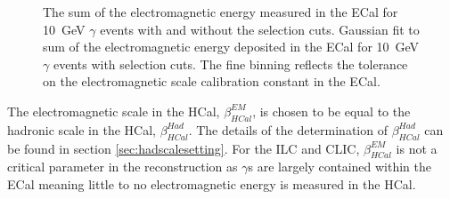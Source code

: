 \begin{figure}[h!]
\caption[\protect{} The sum of the electromagnetic energy measured in the ECal for 10~GeV $\gamma$ events with and without the selection cuts.  \protect{} Gaussian fit to sum of the electromagnetic energy deposited in the ECal for 10~GeV $\gamma$ events with selection cuts.  The fine binning reflects the tolerance on the electromagnetic scale calibration constant in the ECal.]{\protect{} The sum of the electromagnetic energy measured in the ECal for 10~GeV $\gamma$ events with and without the selection cuts.  \protect{} Gaussian fit to sum of the electromagnetic energy deposited in the ECal for 10~GeV $\gamma$ events with selection cuts.  The fine binning reflects the tolerance on the electromagnetic scale calibration constant in the ECal.}
\label{fig:ecalemscale}
\end{figure}
 
The electromagnetic scale in the HCal, $\beta^{EM}_{HCal}$, is chosen to be equal to the hadronic scale in the HCal, $\beta^{Had}_{HCal}$.  The details of the determination of $\beta^{Had}_{HCal}$ can be found in section \ref{sec:hadscalesetting}.  For the ILC and CLIC, $\beta^{EM}_{HCal}$ is not a critical parameter in the reconstruction as $\gamma$s are largely contained within the ECal meaning little to no electromagnetic energy is measured in the HCal.  

